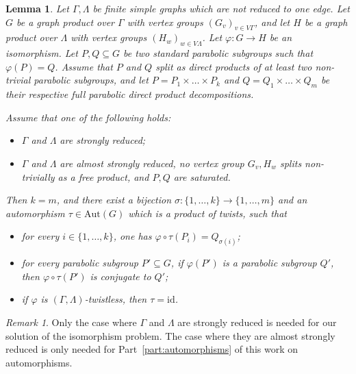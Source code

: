 \documentclass[a4paper,english,11pt]{article}
\newtheorem{lemma}[de]{Lemma}
\theoremstyle{definition}
\theoremstyle{remark}
\newtheorem{rk}[de]{Remark}
\newcommand{\Aut}{\mathrm{Aut}}
\begin{document}
\begin{lemma}\label{lemma:direct-product}
Let $\Gamma,\Lambda$ be finite simple graphs which are not reduced to one edge. Let $G$ be a graph product over $\Gamma$ with vertex groups $(G_v)_{v\in V\Gamma}$, and let $H$ be a graph product over $\Lambda$ with vertex groups $(H_w)_{w\in V\Lambda}$. Let $\varphi:G\to H$ be an isomorphism. Let $P,Q\subseteq G$ be two standard
parabolic subgroups such that $\varphi(P)=Q$. Assume that $P$ and $Q$ split as direct products of at least two non-trivial parabolic subgroups, and let $P=P_1\times\dots\times P_k$ and $Q=Q_1\times\dots\times Q_m$ be their respective full parabolic direct product decompositions. 

Assume that one of the following holds: 
\begin{itemize}
\item $\Gamma$ and $\Lambda$ are strongly reduced;
     \item $\Gamma$ and $\Lambda$ are almost strongly reduced, no vertex group $G_v,H_w$ splits non-trivially as a free product, and $P,Q$ are saturated.
\end{itemize}

Then $k=m$, and there exist a bijection $\sigma:\{1,\dots,k\}\to\{1,\dots,m\}$ and an automorphism $\tau\in\Aut(G)$ which is a product of twists, such that 
\begin{itemize}
\item for every $i\in\{1,\dots,k\}$, one has $\varphi\circ\tau(P_i)=Q_{\sigma(i)}$;
\item for every parabolic subgroup $P'\subseteq G$, if $\varphi(P')$ is a parabolic subgroup $Q'$, then $\varphi\circ\tau(P')$ is conjugate to $Q'$;
\item if $\varphi$ is $(\Gamma,\Lambda)$-twistless, then $\tau=\mathrm{id}$.
\end{itemize}
\end{lemma}

\begin{rk}
Only the case where $\Gamma$ and $\Lambda$ are strongly reduced is needed for our solution of the isomorphism problem. The case where they are almost strongly reduced is only needed for Part~\ref{part:automorphisms} of this work on automorphisms.
\end{rk}
\end{document}
